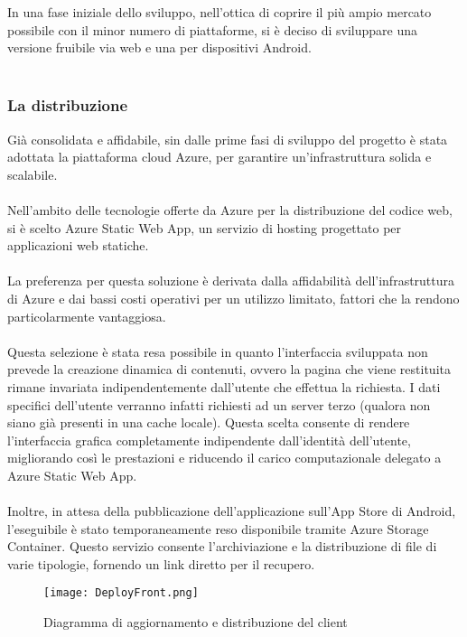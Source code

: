 In una fase iniziale dello sviluppo, nell'ottica di coprire il più ampio mercato possibile con il minor numero di piattaforme,
si è deciso di sviluppare una versione fruibile via web e una per dispositivi Android.\\
\\

\subsubsection{La distribuzione}

Già consolidata e affidabile, sin dalle prime fasi di sviluppo del progetto è stata adottata la piattaforma cloud Azure, per garantire un'infrastruttura solida e scalabile.\\
\\
Nell'ambito delle tecnologie offerte da Azure per la  distribuzione del codice web, si è scelto Azure Static Web App, un servizio di hosting progettato per applicazioni web statiche. \\
\\
La preferenza per questa soluzione è derivata dalla affidabilità dell'infrastruttura di Azure e dai bassi costi operativi per un utilizzo limitato,
fattori che la rendono particolarmente vantaggiosa.\\
\\
Questa selezione è stata resa possibile in quanto l’interfaccia sviluppata non prevede la creazione dinamica di contenuti,
ovvero la pagina che viene restituita rimane invariata indipendentemente dall’utente che effettua la richiesta.
I dati specifici dell’utente verranno infatti richiesti ad un server terzo (qualora non siano già presenti in una cache locale).
Questa scelta consente di rendere l’interfaccia grafica completamente indipendente dall’identità dell’utente,
migliorando così le prestazioni e riducendo il carico computazionale delegato a Azure Static Web App.\\
\\
Inoltre, in attesa della pubblicazione dell’applicazione sull’App Store di Android, l’eseguibile è stato temporaneamente reso disponibile tramite Azure Storage Container.
Questo servizio consente l’archiviazione e la distribuzione di file di varie tipologie, fornendo un link diretto per il recupero.\\

\begin{figure}[h!]
    \begin{center}
        \texttt{[image: DeployFront.png]}
        \caption{Diagramma di aggiornamento e distribuzione del client}
    \end{center}
\end{figure}

